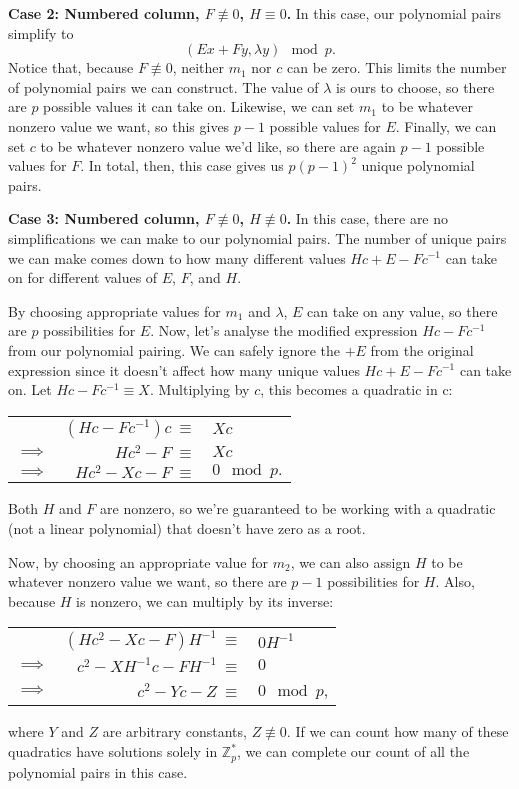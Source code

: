 \documentclass[a4paper, 12pt, reqno]{amsart}
\newcommand{\Z}{\mathbb{Z}}
\begin{document}
	\textbf{Case 2: Numbered column, $F \not\equiv 0$, $H \equiv 0$.} In this case, our polynomial pairs simplify to
	\[
		(Ex + Fy, \lambda y) \mod{p}.
	\]
	Notice that, because $F \not\equiv 0$, neither $m_1$ nor $c$ can be zero. This limits the number of polynomial pairs we can construct. The value of $\lambda$ is ours to 
	choose, so there are $p$ possible values it can take on. Likewise, we can set $m_1$ to be whatever nonzero value we want, so this gives $p-1$ possible values for $E$. 
	Finally, we can set $c$ to be whatever nonzero value we'd like, so there are again $p-1$ possible values for $F$. In total, then, this case gives us $p(p-1)^2$ 
	unique polynomial pairs.
	
	\textbf{Case 3: Numbered column, $F \not\equiv 0$, $H \not\equiv 0$.} In this case, there are no simplifications we can make to our polynomial pairs. The number of unique
	pairs we can make comes down to how many different values $Hc + E - Fc^{-1}$ can take on for different values of $E$, $F$, and $H$.
	
	By choosing appropriate values for $m_1$ and $\lambda$, $E$ can take on any value, so there are $p$ possibilities for $E$. Now, let's analyse the modified expression 
	$Hc - Fc^{-1}$ from our polynomial pairing. We can safely ignore the $+E$ from the original expression since it doesn't affect how many unique values $Hc + E - Fc^{-1}$ 
	can take on. Let $Hc - Fc^{-1} \equiv X$. Multiplying by $c$, this becomes a quadratic in c:
	\begin{center}
		\begin{tabular}{rrl}
					   & $(Hc - Fc^{-1})c\ \equiv$ & $Xc$ \\
			$\implies$ & $Hc^2 - F       \ \equiv$ & $Xc$ \\
			$\implies$ & $Hc^2 - Xc - F  \ \equiv$ & $0 \mod{p}.$
		\end{tabular}
	\end{center}
	Both $H$ and $F$ are nonzero, so we're guaranteed to be working with a quadratic (not a linear polynomial) that doesn't have zero as a root.
	
	Now, by choosing an appropriate value for $m_2$, we can also assign $H$ to be whatever nonzero value we want, so there are $p-1$ possibilities for $H$. Also, because $H$ is
	nonzero, we can multiply by its inverse:
	\begin{center}
		\begin{tabular}{rrl}
			           & $(Hc^2 - Xc - F)H^{-1}\ \equiv$    & $0H^{-1}$ \\
			$\implies$ & $c^2 - XH^{-1}c - FH^{-1}\ \equiv$ & $0$       \\
			$\implies$ & $c^2 - Yc - Z\ \equiv$             & $0 \mod{p}$,
		\end{tabular}
	\end{center}
	where $Y$ and $Z$ are arbitrary constants, $Z \not\equiv 0$. If we can count how many of these quadratics have solutions solely in $\Z_p^*$, we can complete our count of 
	all the polynomial pairs in this case.
	
\end{document}
